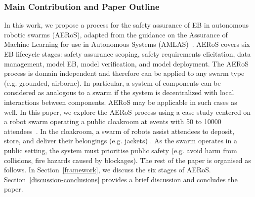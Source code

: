 \documentclass[runningheads]{llncs}
\begin{document}
\subsubsection{Main Contribution and Paper Outline} In this work, we propose a process for the safety assurance of EB in autonomous robotic swarms (AERoS), adapted from the guidance on the Assurance of Machine Learning for use in Autonomous Systems (AMLAS)~\cite{Hawkins2021}. 
AERoS covers six EB lifecycle stages: safety assurance scoping, safety requirements elicitation, data management, model EB, model verification, and  model deployment. 
The AERoS process is domain independent and therefore can be applied to any swarm type (e.g. grounded, airborne). 
In particular, a system of components can be considered as analogous to a swarm if the system is decentralized with local interactions between components. 
AERoS may be applicable in such cases as well. %
In this paper, we explore the AERoS process using a case study centered on a robot swarm operating a public cloakroom at events with 50 to 10000 attendees~\cite{Jones2020}. 
In the cloakroom, a swarm of robots assist attendees to deposit, store, and deliver their belongings (e.g. jackets) \cite{Jones2020}. 
As the swarm operates in a public setting, the system must prioritise public safety (e.g. avoid harm from collisions, fire hazards caused by blockages). 
The rest of the paper is organised as follows. 
In Section~\ref{framework}, we discuss the six stages of AERoS. Section~\ref{discussion-conclusions} provides a brief discussion and concludes the paper. 
\end{document}
